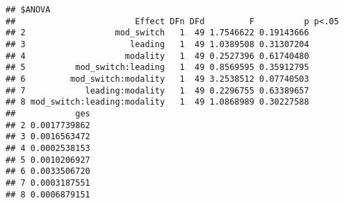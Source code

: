 \documentclass[]{article}
\newenvironment{Shaded}{\begin{snugshade}}{\end{snugshade}}
\newcommand{\CommentTok}[1]{\textcolor[rgb]{0.56,0.35,0.01}{\textit{#1}}}
\newcommand{\DataTypeTok}[1]{\textcolor[rgb]{0.13,0.29,0.53}{#1}}
\newcommand{\DecValTok}[1]{\textcolor[rgb]{0.00,0.00,0.81}{#1}}
\newcommand{\KeywordTok}[1]{\textcolor[rgb]{0.13,0.29,0.53}{\textbf{#1}}}
\newcommand{\NormalTok}[1]{#1}
\newcommand{\OperatorTok}[1]{\textcolor[rgb]{0.81,0.36,0.00}{\textbf{#1}}}
\newcommand{\OtherTok}[1]{\textcolor[rgb]{0.56,0.35,0.01}{#1}}
\newcommand{\StringTok}[1]{\textcolor[rgb]{0.31,0.60,0.02}{#1}}
\begin{document}
\begin{Shaded}
\end{Shaded}

\begin{verbatim}
## $ANOVA
##                        Effect DFn DFd         F          p p<.05
## 2                  mod_switch   1  49 1.7546622 0.19143666      
## 3                     leading   1  49 1.0389508 0.31307204      
## 4                    modality   1  49 0.2527396 0.61740480      
## 5          mod_switch:leading   1  49 0.8569595 0.35912795      
## 6         mod_switch:modality   1  49 3.2538512 0.07740503      
## 7            leading:modality   1  49 0.2296755 0.63389657      
## 8 mod_switch:leading:modality   1  49 1.0868989 0.30227588      
##            ges
## 2 0.0017739862
## 3 0.0016563472
## 4 0.0002538153
## 5 0.0010206927
## 6 0.0033506720
## 7 0.0003187551
## 8 0.0006879151
\end{verbatim}
\end{document}
